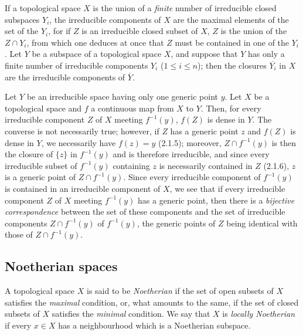 \begin{env}[2.1.7]
\label{0.2.1.7}
If a topological space $X$ is the union of a \emph{finite} number of
irreducible closed subspaces $Y_i$, the irreducible components of $X$
are the maximal elements of the set of the $Y_i$, for if $Z$ is an irreducible
closed subset of $X$, $Z$ is the union of the $Z\cap Y_i$, from which one deduces
at once that $Z$ must be contained in one of the $Y_i$. Let $Y$ be a subspace
of a topological space $X$, and suppose that $Y$ has only a finite number of
irreducible components $Y_i$ ($1\leq i\leq n$); then the closures
$\overline{Y_i}$ in $X$ are the irreducible components of $\overline Y$.
\end{env}

\begin{env}[2.1.8]
\label{0.2.1.8}
Let $Y$ be an irreducible space having only one generic point $y$. Let
$X$ be a topological space and $f$ a continuous map from $X$ to $Y$.
Then, for every irreducible component $Z$ of $X$ meeting $f^{-1}(y)$,
$f(Z)$ is dense in $Y$. The converse is not necessarily true;
however, if $Z$ has a generic point $z$ and $f(Z)$ is dense in
$Y$, we necessarily have $f(z)=y$ (2.1.5); moreover, $Z\cap f^{-1}(y)$ is
then the closure of $\{z\}$ in $f^{-1}(y)$ and is therefore irreducible, and
since every irreducible subset of $f^{-1}(y)$ containing $z$ is
necessarily contained in $Z$ (2.1.6), $z$ is a generic point of
$Z\cap f^{-1}(y)$. Since every irreducible component of $f^{-1}(y)$ is
contained in an irreducible component of $X$, we see that if every
irreducible component $Z$ of $X$ meeting $f^{-1}(y)$ has a generic
point, then there is a \emph{bijective correspondence} between the set of
these components and the set of irreducible components
$Z\cap f^{-1}(y)$ of $f^{-1}(y)$, the generic points of $Z$ being
identical with those of $Z\cap f^{-1}(y)$.
\end{env}


\subsection{Noetherian spaces}
\label{subsection:0.2.2}

\begin{env}[2.2.1]
\label{0.2.2.1}
A topological space $X$ is said to be \emph{Noetherian} if the set of
open subsets of $X$ satisfies the \emph{maximal} condition, or, what amounts to the
same, if the set of closed subsets of $X$ satisfies the \emph{minimal} condition. We
say that $X$ is \emph{locally Noetherian} if every $x\in X$ has a
neighbourhood which is a Noetherian subspace.
\end{env}

